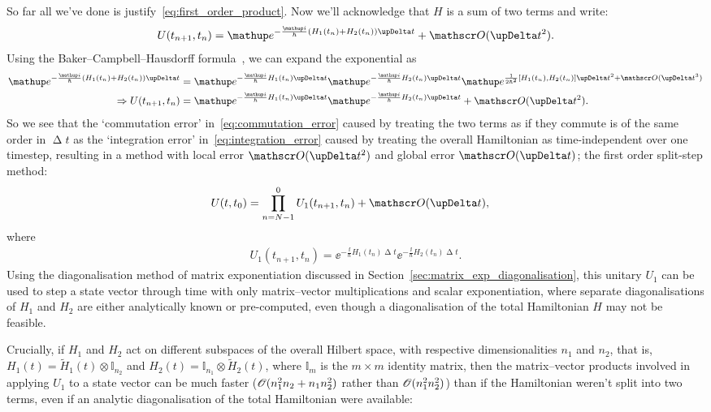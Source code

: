 So far all we've done is justify~\eqref{eq:first_order_product}. Now we'll acknowledge that $H$ is a sum of two terms and write:
\begin{align}
U(t_{n+1}, t_n) = \ee^{-\frac \ii \hbar \left(H_1(t_n) + H_2(t_n)\right)\upDelta t} + \Ord{\upDelta t^2}.
\end{align}
Using the Baker--Campbell--Hausdorff formula~\cite[p.~158]{tannor_introduction_2007}, we can expand the exponential as
\begin{align}
\ee^{-\frac \ii \hbar \left(H_1(t_n) + H_2(t_n)\right)\upDelta t}
&= \ee^{-\frac \ii \hbar H_1(t_n)\upDelta t}
  \ee^{-\frac \ii \hbar H_2(t_n)\upDelta t}
  \ee^{\frac 1 {2\hbar^2} \left[H_1(t_n), H_2(t_n)\right]\upDelta t^2 + \Ord{\upDelta t^3}}\\
\Rightarrow U(t_{n+1}, t_n)
&= \ee^{-\frac \ii \hbar H_1(t_n)\upDelta t}
  \ee^{-\frac \ii \hbar H_2(t_n)\upDelta t} + \Ord{\upDelta t^2}\label{eq:commutation_error}.
\end{align}
So we see that the `commutation error' in~\eqref{eq:commutation_error} caused by treating the two terms as if they commute is of the same order in $\upDelta t$ as the `integration error' in~\eqref{eq:integration_error} caused by treating the overall Hamiltonian as time-independent over one timestep, resulting in a method with local error $\Ord{\upDelta t^2}$ and global error $\Ord{\upDelta t}$; the first order split-step method:
\begin{align}
U(t, t_0) &= \prod_{n=N-1}^0 U_1(t_{n+1}, t_n) + \Ord{\upDelta t},
\end{align}
where
\begin{align}\label{eq:U_1}
U_1(t_{n+1}, t_n) = \ee^{-\frac \ii \hbar H_1(t_n)\upDelta t}
                    \ee^{-\frac \ii \hbar H_2(t_n)\upDelta t}.
\end{align}
Using the diagonalisation method of matrix exponentiation discussed in Section~\ref{sec:matrix_exp_diagonalisation}, this unitary $U_1$ can be used to step a state vector through time with only matrix--vector multiplications and scalar exponentiation, where separate diagonalisations of $H_1$ and $H_2$ are either analytically known or pre-computed, even though a diagonalisation of the total Hamiltonian $H$ may not be feasible.

Crucially, if $H_1$ and $H_2$ act on different subspaces of the overall Hilbert space, with respective dimensionalities $n_1$ and $n_2$, that is, $H_1(t) = \tilde H_1(t)\otimes\mathbb{I}_{n_2} $ and $H_2(t) = \mathbb{I}_{n_1}\otimes\tilde H_2(t)$, where $\mathbb{I}_m$ is the $m\times m$ identity matrix, then the matrix--vector products involved in applying $U_1$ to a state vector can be much faster ($\mathscr{O}(n_1^2 n_2 + n_1 n_2^2)$ rather than $\mathscr{O}(n_1^2 n_2^2)$) than if the Hamiltonian weren't split into two terms, even if an analytic diagonalisation of the total Hamiltonian were available:

